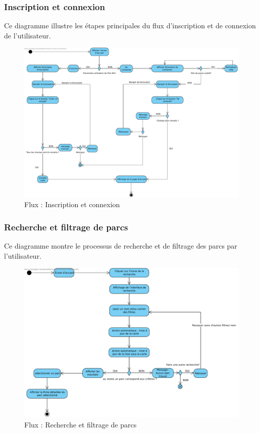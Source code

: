 \documentclass[12pt,a4paper]{article}
\begin{document}
\subsubsection{Inscription et connexion}

Ce diagramme illustre les étapes principales du flux d'inscription et de connexion de l'utilisateur.

\begin{figure}[h!]
  \centering
  \includegraphics[width=0.9\linewidth]{attachments/Inscription_Connexion.pdf}
  \caption{Flux : Inscription et connexion}
\end{figure}

\subsubsection{Recherche et filtrage de parcs}

Ce diagramme montre le processus de recherche et de filtrage des parcs par l'utilisateur.

\begin{figure}[h!]
  \centering
  \includegraphics[width=0.9\linewidth]{attachments/Recherche_Filtrage_Parcs.pdf}
  \caption{Flux : Recherche et filtrage de parcs}
\end{figure}
\end{document}
